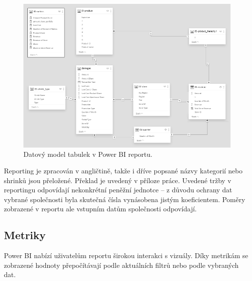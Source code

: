 \begin{figure}[hbtp!]
    \centering
    \captionsetup{justification=centering}
    \includegraphics[width=\textwidth]{obrazky/PBI/datmodel.png}
    \caption{Datový model tabulek v Power BI reportu.}
    \label{obr:datmod}
\end{figure}

Reporting je zpracován v angličtině, takže i dříve popsané názvy kategorií nebo shrinků jsou přeložené. Překlad je uvedený v příloze práce. Uvedené tržby v reportingu odpovídají nekonkrétní peněžní jednotce -- z důvodu ochrany dat vybrané společnosti byla skutečná čísla vynásobena jistým koeficientem. Poměry zobrazené v reportu ale vstupním datům společnosti odpovídají.

\subsection{Metriky}

Power BI nabízí uživatelům reportu širokou interakci s vizuály. Díky metrikám se zobrazené hodnoty přepočítávají podle aktuálních filtrů nebo podle vybraných dat. 

